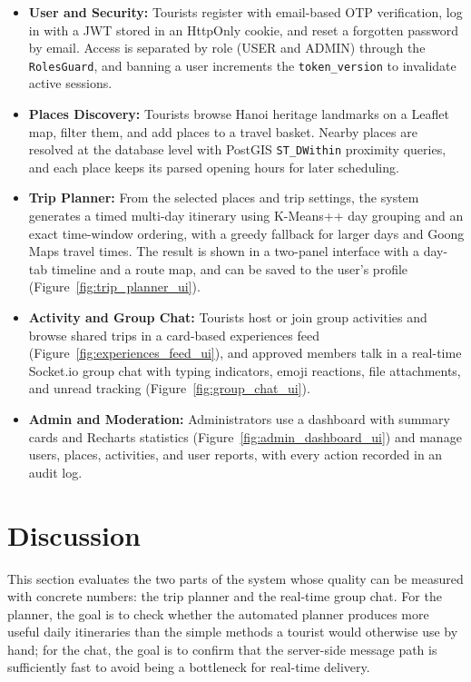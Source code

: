 \documentclass[a4paper,12pt]{report}
\begin{document}
\begin{itemize}
    \item \textbf{User and Security:} Tourists register with email-based OTP verification, log in with a JWT stored in an HttpOnly cookie, and reset a forgotten password by email. Access is separated by role (USER and ADMIN) through the \texttt{RolesGuard}, and banning a user increments the \texttt{token\_version} to invalidate active sessions.

    \item \textbf{Places Discovery:} Tourists browse Hanoi heritage landmarks on a Leaflet map, filter them, and add places to a travel basket. Nearby places are resolved at the database level with PostGIS \texttt{ST\_DWithin} proximity queries, and each place keeps its parsed opening hours for later scheduling.

    \item \textbf{Trip Planner:} From the selected places and trip settings, the system generates a timed multi-day itinerary using K-Means++ day grouping and an exact time-window ordering, with a greedy fallback for larger days and Goong Maps travel times. The result is shown in a two-panel interface with a day-tab timeline and a route map, and can be saved to the user's profile (Figure~\ref{fig:trip_planner_ui}).

    \item \textbf{Activity and Group Chat:} Tourists host or join group activities and browse shared trips in a card-based experiences feed (Figure~\ref{fig:experiences_feed_ui}), and approved members talk in a real-time Socket.io group chat with typing indicators, emoji reactions, file attachments, and unread tracking (Figure~\ref{fig:group_chat_ui}).

    \item \textbf{Admin and Moderation:} Administrators use a dashboard with summary cards and Recharts statistics (Figure~\ref{fig:admin_dashboard_ui}) and manage users, places, activities, and user reports, with every action recorded in an audit log.
\end{itemize}


\section{Discussion}

This section evaluates the two parts of the system whose quality can be measured with concrete numbers: the trip planner and the real-time group chat. For the planner, the goal is to check whether the automated planner produces more useful daily itineraries than the simple methods a tourist would otherwise use by hand; for the chat, the goal is to confirm that the server-side message path is sufficiently fast to avoid being a bottleneck for real-time delivery.
\end{document}

